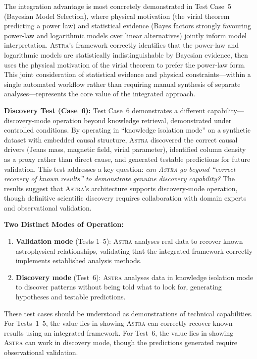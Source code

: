 \documentclass[fleqn,usenatbib]{mnras}
\newcommand{\astra}{\textsc{Astra}\xspace}
\begin{document}
The integration advantage is most concretely demonstrated in Test Case~5 (Bayesian Model Selection), where physical motivation (the virial theorem predicting a power law) and statistical evidence (Bayes factors strongly favouring power-law and logarithmic models over linear alternatives) jointly inform model interpretation.
\astra's framework correctly identifies that the power-law and logarithmic models are statistically indistinguishable by Bayesian evidence, then uses the physical motivation of the virial theorem to prefer the power-law form.
This joint consideration of statistical evidence and physical constraints---within a single automated workflow rather than requiring manual synthesis of separate analyses---represents the core value of the integrated approach.

\textbf{Discovery Test (Case~6):}
Test Case~6 demonstrates a different capability---discovery-mode operation beyond knowledge retrieval, demonstrated under controlled conditions.
By operating in ``knowledge isolation mode'' on a synthetic dataset with embedded causal structure, \astra discovered the correct causal drivers (Jeans mass, magnetic field, virial parameter), identified column density as a proxy rather than direct cause, and generated testable predictions for future validation.
This test addresses a key question: \emph{can \astra go beyond ``correct recovery of known results'' to demonstrate genuine discovery capability?}
The results suggest that \astra's architecture supports discovery-mode operation, though definitive scientific discovery requires collaboration with domain experts and observational validation.

\textbf{Two Distinct Modes of Operation:}
\begin{enumerate}
  \item[(i)] \textbf{Validation mode} (Tests 1--5): \astra analyses real data to recover known astrophysical relationships, validating that the integrated framework correctly implements established analysis methods.
  \item[(ii)] \textbf{Discovery mode} (Test~6): \astra analyses data in knowledge isolation mode to discover patterns without being told what to look for, generating hypotheses and testable predictions.
\end{enumerate}

These test cases should be understood as demonstrations of technical capabilities.
For Tests~1--5, the value lies in showing \astra can correctly recover known results using an integrated framework.
For Test~6, the value lies in showing \astra can work in discovery mode, though the predictions generated require observational validation.
\end{document}

